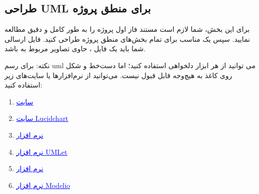 \documentclass[]{article}
\begin{document}
\newpage
\subsection*{{\titr طراحی UML برای منطق پروژه}}
\label{subsec:uml}

برای این بخش، شما لازم است مستند فاز اول پروژه را به طور کامل و دقیق مطالعه نمایید. سپس یک  مناسب برای تمام بخش‌های منطق پروژه طراحی کنید. فایل ارسالی شما باید یک فایل ، حاوی تصاویر مربوط به  باشد.

نکته: برای رسم uml می توانید از هر ابزار دلخواهی استفاده کنید؛ اما دست‌خط و شکل روی کاغذ به هیچ‌وجه قابل قبول نیست. می‌توانید از نرم‌افزارها یا سایت‌های زیر استفاده کنید:

\begin{enumerate}
	
	\item
	
	\href{https://app.diagrams.net/}{\textcolor{blue}{\underline{سایت }}} 
	
	\item
	
	\href{https://www.lucidchart.com/pages/}{\textcolor{blue}{\underline{سایت Lucidchart}}} 
	
	
	\item
	
	\href{https://products.office.com/en/visio/flowchart-software}{\textcolor{blue}{\underline{نرم افزار }}} 
	
	
	\item
	
	\href{https://www.umlet.com/changes.htm}{\textcolor{blue}{\underline{نرم افزار UMLet}}} 
	
	
	\item
	
	\href{https://online.visual-paradigm.com/}{\textcolor{blue}{\underline{نرم افزار }}} 
	
	
	\item
	
	\href{https://www.modelio.org/}{\textcolor{blue}{\underline{نرم افزار Modelio}}} 
	
	

	
	
	
\end{enumerate}
\end{document}
